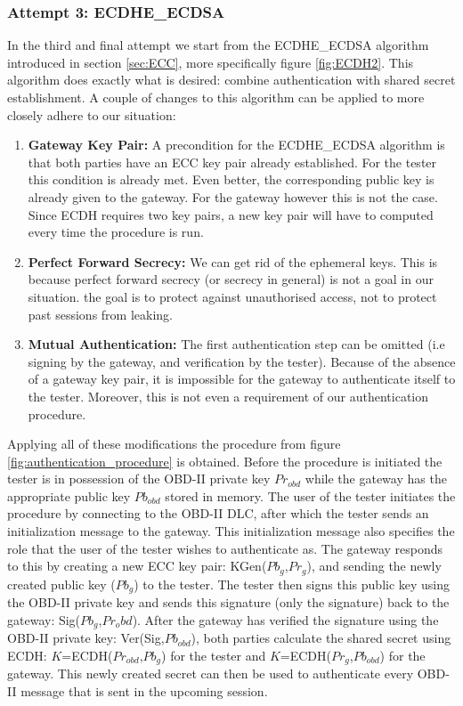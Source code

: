 \documentclass[master=cws,masteroption=vs,english]{kulemt}
\begin{document}
\subsubsection{Attempt 3: ECDHE\_ECDSA} 
In the third and final attempt we start from the ECDHE\_ECDSA algorithm introduced in section \ref{sec:ECC}, more specifically figure \ref{fig:ECDH2}. This algorithm does exactly what is desired: combine authentication with shared secret establishment. A couple of changes to this algorithm can be applied to more closely adhere to our situation:
\begin{enumerate}
	\item \textbf{Gateway Key Pair:} A precondition for the ECDHE\_ECDSA algorithm is that both parties have an ECC key pair already established. For the tester this condition is already met. Even better, the corresponding public key is already given to the gateway. For the gateway however this is not the case. Since ECDH requires two key pairs, a new key pair will have to computed every time the procedure is run.
	
	\item \textbf{Perfect Forward Secrecy:} We can get rid of the ephemeral keys. This is because perfect forward secrecy (or secrecy in general) is not a goal in our situation. the goal is to protect against unauthorised access, not to protect past sessions from leaking. 
	
	\item \textbf{Mutual Authentication:} The first authentication step can be omitted (i.e signing by the gateway, and verification by the tester). Because of the absence of a gateway key pair, it is impossible for the gateway to authenticate itself to the tester. Moreover, this is not even a requirement of our authentication procedure.
\end{enumerate}
Applying all of these modifications the procedure from figure \ref{fig:authentication_procedure} is obtained. Before the procedure is initiated the tester is in possession of the OBD-II private key $Pr_{obd}$ while the gateway has the appropriate public key $Pb_{obd}$ stored in memory. The user of the tester initiates the procedure by connecting to the OBD-II DLC, after which the tester sends an initialization message to the gateway. This initialization message also specifies the role that the user of the tester wishes to authenticate as. The gateway responds to this by creating a new ECC key pair: KGen($Pb_g$,$Pr_g$), and sending the newly created public key ($Pb_g$) to the tester. The tester then signs this public key using the OBD-II private key and sends this signature (only the signature) back to the gateway: Sig($Pb_g$,$Pr_obd$). After the gateway has verified the signature using the OBD-II private key: Ver(Sig,$Pb_{obd}$), both parties calculate the shared secret using ECDH: $K$=ECDH($Pr_{obd}$,$Pb_g$) for the tester and $K$=ECDH($Pr_g$,$Pb_{obd}$) for the gateway. This newly created secret can then be used to authenticate every OBD-II message that is sent in the upcoming session.
 
\end{document}
